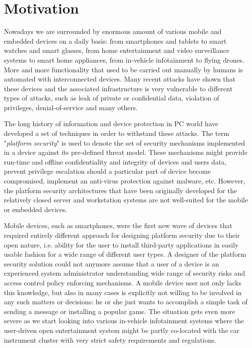 \begin{quoting}
\end{quoting}

\section{Motivation}

Nowadays we are surrounded by enormous amount of various mobile and embedded devices on a daily basis: from smartphones and tablets to smart watches and smart glasses, from home entertainment and video surveillance systems to smart home appliances, from in-vehicle infotainment to flying drones. More and more functionality that used to be carried out manually by humans is automated with interconnected devices. Many recent attacks have shown that these devices and the associated infrastructure is very vulnerable to different types of attacks, such as leak of private or confidential data, violation of privileges, denial-of-service and many others. 

The long history of information and device protection in PC world have developed a set of techniques in order to withstand these attacks. The term "\textit{platform security}" is used to denote the set of security mechanisms implemented in a device against its pre-defined threat model. These mechanisms might provide run-time and offline confidentiality and integrity of devices and users data, prevent privilege escalation should a particular part of device become compromised, implement an anti-virus protection against malware, etc. However, the platform security architectures that have been originally developed for the relatively closed server and workstation systems are not well-suited for the mobile or embedded devices. 

Mobile devices, such as smartphones, were the first new wave of devices that required entirely different approach for designing platform security due to their open nature, i.e. ability for the user to install third-party applications in easily usable fashion for a wide range of different user types. A designer of the platform security solution could not anymore assume that a user of a device is an experienced system administrator understanding wide range of security risks and access control policy enforcing mechanisms. A mobile device user not only lacks this knowledge, but also in many cases is explicitly not willing to be involved in any such matters or decisions: he or she just wants to accomplish a simple task of sending a message or installing a popular game. The situation gets even more severe as we start looking into various in-vehicle infotainment systems where the user-driven open entertainment system might be partly co-located with the car instrument cluster with very strict safety requirements and regulations. 

